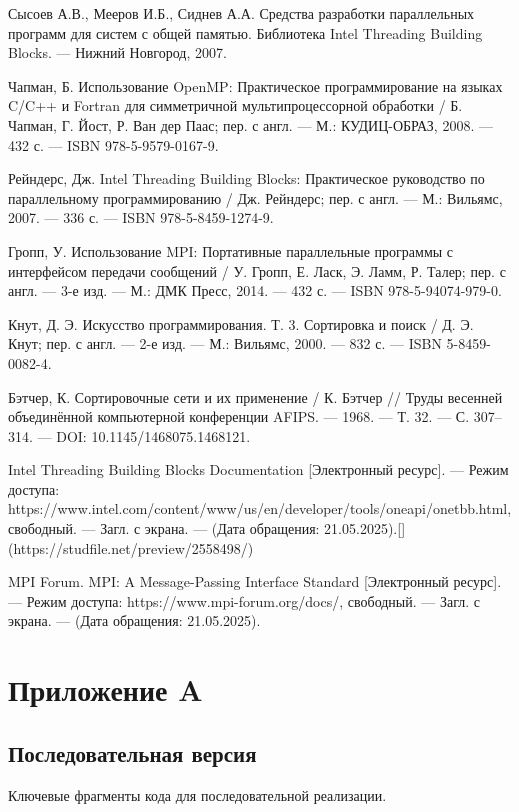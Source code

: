 \documentclass[12pt,a4paper]{extarticle}
\newcommand{\appendixsection}[1]{%
	\clearpage
	\section*{\centering Приложение #1}
	\addcontentsline{toc}{section}{Приложение #1}
}
\begin{document}
\begin{thebibliography}{9}
	Сысоев А.В., Мееров И.Б., Сиднев А.А. Средства разработки параллельных программ для систем с общей памятью. Библиотека Intel Threading Building Blocks. — Нижний Новгород, 2007.
	
	Чапман, Б. Использование OpenMP: Практическое программирование на языках C/C++ и Fortran для симметричной мультипроцессорной обработки / Б. Чапман, Г. Йост, Р. Ван дер Паас; пер. с англ. — М.: КУДИЦ-ОБРАЗ, 2008. — 432 с. — ISBN 978-5-9579-0167-9.
	
	Рейндерс, Дж. Intel Threading Building Blocks: Практическое руководство по параллельному программированию / Дж. Рейндерс; пер. с англ. — М.: Вильямс, 2007. — 336 с. — ISBN 978-5-8459-1274-9.
	
	Гропп, У. Использование MPI: Портативные параллельные программы с интерфейсом передачи сообщений / У. Гропп, Е. Ласк, Э. Ламм, Р. Талер; пер. с англ. — 3-е изд. — М.: ДМК Пресс, 2014. — 432 с. — ISBN 978-5-94074-979-0.
	
	Кнут, Д. Э. Искусство программирования. Т. 3. Сортировка и поиск / Д. Э. Кнут; пер. с англ. — 2-е изд. — М.: Вильямс, 2000. — 832 с. — ISBN 5-8459-0082-4.
	
	Бэтчер, К. Сортировочные сети и их применение / К. Бэтчер // Труды весенней объединённой компьютерной конференции AFIPS. — 1968. — Т. 32. — С. 307–314. — DOI: 10.1145/1468075.1468121.
	
	Intel Threading Building Blocks Documentation [Электронный ресурс]. — Режим доступа: https://www.intel.com/content/www/us/en/developer/tools/oneapi/onetbb.html, свободный. — Загл. с экрана. — (Дата обращения: 21.05.2025).[](https://studfile.net/preview/2558498/)
	
	MPI Forum. MPI: A Message-Passing Interface Standard [Электронный ресурс]. — Режим доступа: https://www.mpi-forum.org/docs/, свободный. — Загл. с экрана. — (Дата обращения: 21.05.2025).
	
\end{thebibliography}
	

\appendixsection{A}
\subsection*{Последовательная версия}
	Ключевые фрагменты кода для последовательной реализации.
\end{document}
